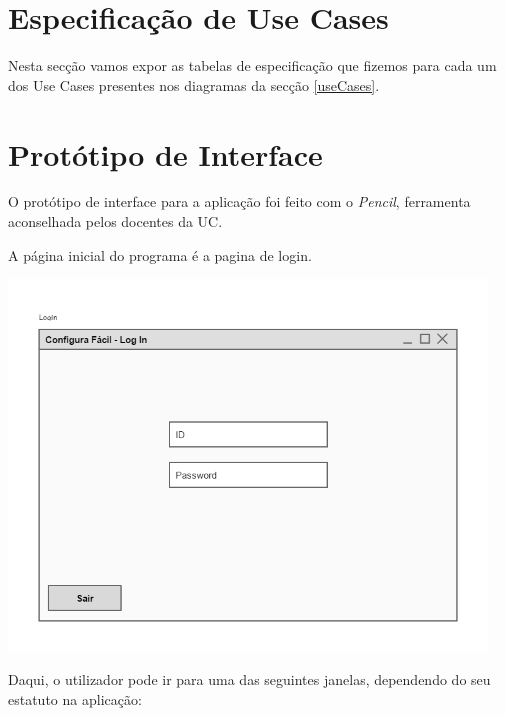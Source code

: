 \documentclass[11pt]{article} %
\begin{document}
\newpage
\section{Especificação de Use Cases}
Nesta secção vamos expor as tabelas de especificação que fizemos para cada um dos Use Cases presentes nos diagramas da secção \ref{useCases}.

\section{Protótipo de Interface}
O protótipo de interface para a aplicação foi feito com o \textit{Pencil}, ferramenta aconselhada pelos docentes da UC.

A página inicial do programa é a pagina de login.
\begin{center}
 	\includegraphics[width = 5in]{configura_fcil_root.png}
\end{center}

Daqui, o utilizador pode ir para uma das seguintes janelas, dependendo do seu estatuto na aplicação:
\end{document}
